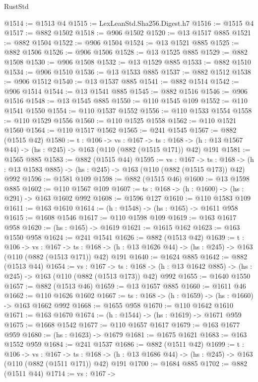 \begin{lexlean}{RustStd}
\begin{coremodule}
@1514 := @1513 @4
@1515 := LexLeanStd.Sha256.Digest.h7
@1516 := @1515 @4
@1517 := @882 @1502
@1518 := @906 @1502
@1520 := @13 @1517 @885
@1521 := @882 @1504
@1522 := @906 @1504
@1524 := @13 @1521 @885
@1525 := @882 @1506
@1526 := @906 @1506
@1528 := @13 @1525 @885
@1529 := @882 @1508
@1530 := @906 @1508
@1532 := @13 @1529 @885
@1533 := @882 @1510
@1534 := @906 @1510
@1536 := @13 @1533 @885
@1537 := @882 @1512
@1538 := @906 @1512
@1540 := @13 @1537 @885
@1541 := @882 @1514
@1542 := @906 @1514
@1544 := @13 @1541 @885
@1545 := @882 @1516
@1546 := @906 @1516
@1548 := @13 @1545 @885
@1550 := @110 @1545 @109
@1552 := @110 @1541 @1550
@1554 := @110 @1537 @1552
@1556 := @110 @1533 @1554
@1558 := @110 @1529 @1556
@1560 := @110 @1525 @1558
@1562 := @110 @1521 @1560
@1564 := @110 @1517 @1562
@1565 := @241 @1545
@1567 := @882 (@1515 @42)
@1580 := {t : @106} ->
  {vs : @167} ->
  {ts : @168} -> (h : @13 @1567 @44) -> (hs : @245) -> @163 (@110 (@882 (@1515 @171)) @42) @191
@1581 := @1565 @885
@1583 := @882 (@1515 @44)
@1595 := {vs : @167} ->
  {ts : @168} -> (h : @13 @1583 @885) -> (hs : @245) -> @163 (@110 (@882 (@1515 @173)) @42) @992
@1596 := @1581 @109
@1598 := @882 (@1515 @46)
@1600 := @13 @1598 @885
@1602 := @110 @1567 @109
@1607 := {ts : @168} -> (h : @1600) -> (hs : @291) -> @163 @1602 @992
@1608 := @1596 @127
@1610 := @110 @1583 @109
@1611 := @163 @1610
@1614 := (h : @1548) -> (hs : @165) -> @1611 @958
@1615 := @1608 @1546
@1617 := @110 @1598 @109
@1619 := @163 @1617 @958
@1620 := (hs : @165) -> @1619
@1621 := @1615 @162
@1623 := @163 @1550 @958
@1624 := @241 @1541
@1626 := @882 (@1513 @42)
@1639 := {t : @106} ->
  {vs : @167} ->
  {ts : @168} -> (h : @13 @1626 @44) -> (hs : @245) -> @163 (@110 (@882 (@1513 @171)) @42) @191
@1640 := @1624 @885
@1642 := @882 (@1513 @44)
@1654 := {vs : @167} ->
  {ts : @168} -> (h : @13 @1642 @885) -> (hs : @245) -> @163 (@110 (@882 (@1513 @173)) @42) @992
@1655 := @1640 @1550
@1657 := @882 (@1513 @46)
@1659 := @13 @1657 @885
@1660 := @1611 @46
@1662 := @110 @1626 @1602
@1667 := {ts : @168} -> (h : @1659) -> (hs : @1660) -> @163 @1662 @992
@1668 := @1655 @958
@1670 := @110 @1642 @1610
@1671 := @163 @1670
@1674 := (h : @1544) -> (hs : @1619) -> @1671 @959
@1675 := @1668 @1542
@1677 := @110 @1657 @1617
@1679 := @163 @1677 @959
@1680 := (hs : @1623) -> @1679
@1681 := @1675 @1621
@1683 := @163 @1552 @959
@1684 := @241 @1537
@1686 := @882 (@1511 @42)
@1699 := {t : @106} ->
  {vs : @167} ->
  {ts : @168} -> (h : @13 @1686 @44) -> (hs : @245) -> @163 (@110 (@882 (@1511 @171)) @42) @191
@1700 := @1684 @885
@1702 := @882 (@1511 @44)
@1714 := {vs : @167} ->

\end{coremodule}
\end{lexlean}
